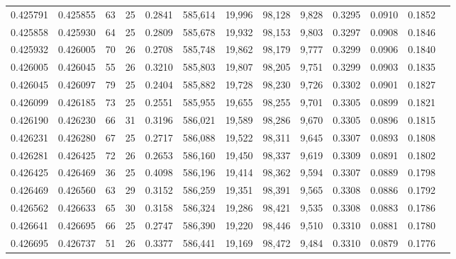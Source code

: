 \begin{tabular}{rrrrrrrrrrrrr}
0.425791 & 0.425855 &    63 &  25 &                                     0.2841 & 585,614 &  19,996 &  98,128 &   9,828 & 0.3295 & 0.0910 & 0.1852 \\
0.425858 & 0.425930 &    64 &  25 &                                     0.2809 & 585,678 &  19,932 &  98,153 &   9,803 & 0.3297 & 0.0908 & 0.1846 \\
0.425932 & 0.426005 &    70 &  26 &                                     0.2708 & 585,748 &  19,862 &  98,179 &   9,777 & 0.3299 & 0.0906 & 0.1840 \\
0.426005 & 0.426045 &    55 &  26 &                                     0.3210 & 585,803 &  19,807 &  98,205 &   9,751 & 0.3299 & 0.0903 & 0.1835 \\
0.426045 & 0.426097 &    79 &  25 &                                     0.2404 & 585,882 &  19,728 &  98,230 &   9,726 & 0.3302 & 0.0901 & 0.1827 \\
0.426099 & 0.426185 &    73 &  25 &                                     0.2551 & 585,955 &  19,655 &  98,255 &   9,701 & 0.3305 & 0.0899 & 0.1821 \\
0.426190 & 0.426230 &    66 &  31 &                                     0.3196 & 586,021 &  19,589 &  98,286 &   9,670 & 0.3305 & 0.0896 & 0.1815 \\
0.426231 & 0.426280 &    67 &  25 &                                     0.2717 & 586,088 &  19,522 &  98,311 &   9,645 & 0.3307 & 0.0893 & 0.1808 \\
0.426281 & 0.426425 &    72 &  26 &                                     0.2653 & 586,160 &  19,450 &  98,337 &   9,619 & 0.3309 & 0.0891 & 0.1802 \\
0.426425 & 0.426469 &    36 &  25 &                                     0.4098 & 586,196 &  19,414 &  98,362 &   9,594 & 0.3307 & 0.0889 & 0.1798 \\
0.426469 & 0.426560 &    63 &  29 &                                     0.3152 & 586,259 &  19,351 &  98,391 &   9,565 & 0.3308 & 0.0886 & 0.1792 \\
0.426562 & 0.426633 &    65 &  30 &                                     0.3158 & 586,324 &  19,286 &  98,421 &   9,535 & 0.3308 & 0.0883 & 0.1786 \\
0.426641 & 0.426695 &    66 &  25 &                                     0.2747 & 586,390 &  19,220 &  98,446 &   9,510 & 0.3310 & 0.0881 & 0.1780 \\
0.426695 & 0.426737 &    51 &  26 &                                     0.3377 & 586,441 &  19,169 &  98,472 &   9,484 & 0.3310 & 0.0879 & 0.1776 \\

\end{tabular}
